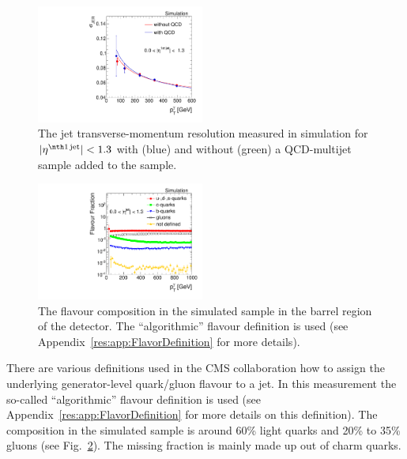 \begin{figure}[!b]
  \centering
      \includegraphics[width=0.49\textwidth]{figures/resolution/systematicUncertainties/Resolution_for_1_eta_bin_QCDUncertainty_RMS99.pdf}
  \caption{The jet transverse-momentum resolution measured in simulation for $|\etafirstjet| < 1.3$ with (blue) and without (green) a QCD-multijet sample added to the \GAMJET sample.}  
  \label{res:fig:QCDuncertainty}
\vspace{70pt}
\end{figure}
\begin{figure}[!b]
  \centering
      \includegraphics[width=0.49\textwidth]{figures/resolution/systematicUncertainties/flavorFraction_barrel_algo.pdf}
  \caption{The flavour composition in the simulated \GAMJET sample in the barrel region of the detector. The ``algorithmic'' flavour definition is used (see Appendix~\ref{res:app:FlavorDefinition} for more details).}  
  \label{res:fig:FlavorFraction}
\end{figure}


There are various definitions used in the CMS collaboration how to assign the underlying generator-level quark/gluon flavour to a jet.
In this measurement the so-called ``algorithmic'' flavour definition is used (see Appendix~\ref{res:app:FlavorDefinition} for more details on this definition).
The composition in the simulated \pythia \GAMJET sample is around 60\% light quarks and 20\% to 35\% gluons (see Fig.~\ref{res:fig:FlavorFraction}). 
The missing fraction is mainly made up out of charm quarks. 


